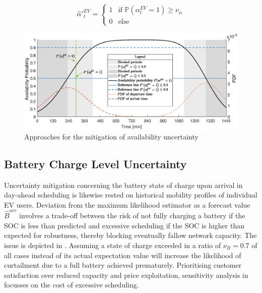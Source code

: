 \begin{equation}
\hat{\alpha}'^{EV}_{t} = \begin{cases}
1 & \text{if  }\mathbb{P}\left(\alpha^{EV}_{t}=1\right) \geq \nu_{\alpha} \\
0 & \text{else}
\end{cases}
\end{equation}


\begin{figure}[]
	\includegraphics[width=\textwidth,trim={1.5cm 0cm 1.5cm 0.2cm},clip]{figures/mitigation/av_mit.eps}
	\caption{Approaches for the mitigation of availability uncertainty}
	\label{fig:av_mit}
\end{figure}

\subsection{Battery Charge Level Uncertainty}

Uncertainty mitigation concerning the battery state of charge upon arrival in day-ahead scheduling is likewise rested on historical mobility profiles of individual EV users. Deviation from the maximum likelihood estimator as a forecast value $\hat{B}^{arr}$ involves a trade-off between the risk of not fully charging a battery if the SOC is less than predicted and excessive scheduling if the SOC is higher than expected for robustness, thereby blocking eventually fallow network capacity. The issue is depicted in . Assuming a state of charge exceeded in a ratio of $\nu_{B}=0.7$ of all cases instead of its actual expectation value will increase the likelihood of curtailment due to a full battery achieved prematurely. Prioritising customer satisfaction over reduced capacity and price exploitation, sensitivity analysis in  focusses on the cost of excessive scheduling.

